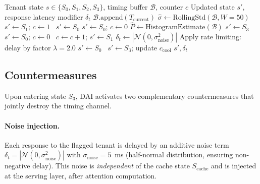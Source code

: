 \documentclass[11pt]{article}
\begin{document}
\begin{algorithm}[t]
\caption{DAI Per-Tenant State Machine}
\label{alg:dai}
\begin{algorithmic}[1]
\Require Tenant state $s \in \{S_0, S_1, S_2, S_3\}$, timing buffer $\mathcal{B}$, counter $c$
\Ensure Updated state $s'$, response latency modifier $\delta_t$
\State $\mathcal{B}.\text{append}(T_{\mathrm{current}})$ 
\State $\hat{\sigma} \gets \text{RollingStd}(\mathcal{B}, W{=}50)$
    \If{$\hat{\sigma} > \tau_\sigma$}
        $s' \gets S_1$; $c \gets 1$
    \Else~$s' \gets S_0$
    \EndIf
{}
    \If{$\hat{\sigma} \leq \tau_\sigma$}
        $s' \gets S_0$; $c \gets 0$ 
        \State $\hat{P} \gets \text{HistogramEstimate}(\mathcal{B})$
            $s' \gets S_3$ 
        \Else~$s' \gets S_0$; $c \gets 0$ 
        \EndIf
    \Else~$c \gets c + 1$; $s' \gets S_1$
    \EndIf
{}
    \State $\delta_t \gets |\mathcal{N}(0, \sigma_{\mathrm{noise}}^2)|$ 
    \State Apply rate limiting: delay by factor $\lambda = 2.0$
        $s' \gets S_0$ 
    \Else~$s' \gets S_3$; update $c_{\mathrm{cool}}$
    \EndIf
\EndIf
\State \Return $s', \delta_t$
\end{algorithmic}
\end{algorithm}

\subsection{Countermeasures}
\label{sec:dai:countermeasures}

Upon entering state $S_3$, DAI activates two complementary countermeasures that jointly
destroy the timing channel.

\paragraph{Noise injection.}
Each response to the flagged tenant is delayed by an additive noise term
$\delta_t = |\mathcal{N}(0, \sigma_{\mathrm{noise}}^2)|$ with
$\sigma_{\mathrm{noise}} = 5$~ms (half-normal distribution, ensuring non-negative delay).
This noise is \emph{independent} of the cache state $S_{\mathrm{cache}}$ and is injected
at the serving layer, after attention computation.
\end{document}
